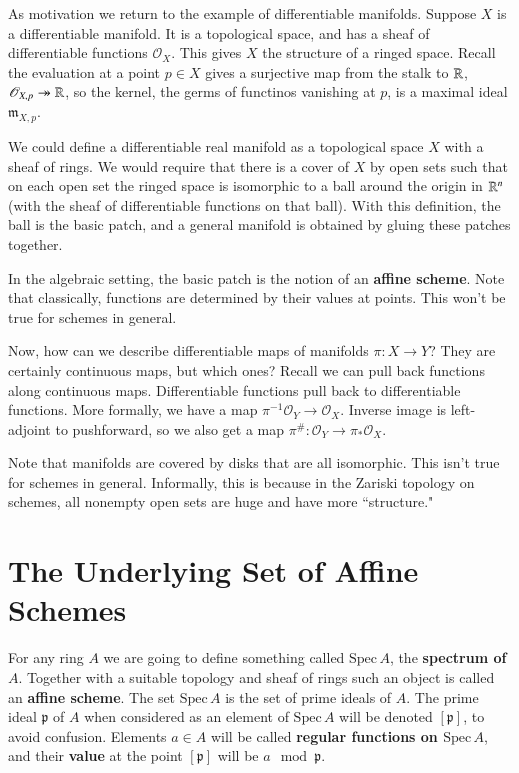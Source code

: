 \begin{example}
    As motivation we return to the example of differentiable manifolds. Suppose $X$ is a differentiable manifold. It is a topological space, and has a sheaf of differentiable functions $\mathscr{O}_X$. This gives $X$ the structure of a ringed space. Recall the evaluation at a point $p \in X$ gives a surjective map from the stalk to $\mathbb R$, $\mathscr{O}_{X,p}\twoheadrightarrow \mathbb R$, so the kernel, the germs of functinos vanishing at $p$, is a maximal ideal $\mathfrak{m}_{X,p}$.

    We could define a differentiable real manifold as a topological space $X$ with a sheaf of rings. We would require that there is a cover of $X$ by open sets such that on each open set the ringed space is isomorphic to a ball around the origin in $\mathbb R^n$ (with the sheaf of differentiable functions on that ball). With this definition, the ball is the basic patch, and a general manifold is obtained by gluing these patches together.
\end{example}

In the algebraic setting, the basic patch is the notion of an \textbf{affine scheme}. Note that classically, functions are determined by their values at points. This won't be true for schemes in general.

Now, how can we describe differentiable maps of manifolds $\pi:X\rightarrow Y$? They are certainly continuous maps, but which ones? Recall we can pull back functions along continuous maps. Differentiable functions pull back to differentiable functions. More formally, we have a map $\pi^{-1}\mathscr{O}_Y\rightarrow \mathscr{O}_X$. Inverse image is left-adjoint to pushforward, so we also get a map $\pi^{\#}:\mathscr{O}_Y\rightarrow \pi_*\mathscr{O}_X$.

Note that manifolds are covered by disks that are all isomorphic. This isn't true for schemes in general. Informally, this is because in the Zariski topology on schemes, all nonempty open sets are huge and have more ``structure."

\section{The Underlying Set of Affine Schemes}

For any ring $A$ we are going to define something called $\text{Spec}\,A$, the \textbf{spectrum of $A$}. Together with a suitable topology and sheaf of rings such an object is called an \textbf{affine scheme}. The set $\text{Spec}\,A$ is the set of prime ideals of $A$. The prime ideal $\mathfrak{p}$ of $A$ when considered as an element of $\text{Spec}\,A$ will be denoted $[\mathfrak{p}]$, to avoid confusion. Elements $a \in A$ will be called \textbf{regular functions on $\text{Spec}\,A$}, and their \textbf{value} at the point $[\mathfrak{p}]$ will be $a\mod \mathfrak{p}$.


